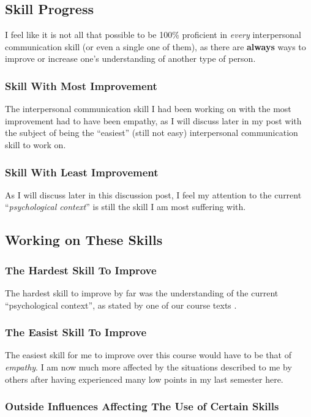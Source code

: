 \documentclass[stu,12pt]{apa7}
\begin{document}
    \subsection{Skill Progress}
      I feel like it is not all that possible to be 100\% proficient in
        \textit{every} interpersonal communication skill (or even a single
        one of them), as there are \textbf{always} ways to improve or increase
        one's understanding of another type of person.
      \subsubsection{Skill With Most Improvement}
        The interpersonal communication skill I had been working on with the
          most improvement had to have been empathy, as I will discuss later
          in my post with the subject of being the ``easiest'' (still not easy)
          interpersonal communication skill to work on.
      \subsubsection{Skill With Least Improvement}
        As I will discuss later in this discussion post, I feel my attention to
          the current ``\textit{psychological context}'' is still the skill
          I am most suffering with.


    \subsection{Working on These Skills}
      \subsubsection{The Hardest Skill To Improve}
        The hardest skill to improve by far was the understanding of the current
          ``psychological context'', as stated by one of our course texts
          \parencite{noauthor_communication_2013}.
      \subsubsection{The Easist Skill To Improve}
        The easiest skill for me to improve over this course would have to be
          that of \textit{empathy}. I am now much more affected by the
          situations described to me by others after having experienced many
          low points in my last semester here.
      \subsubsection{Outside Influences Affecting The Use of Certain Skills}
\end{document}
